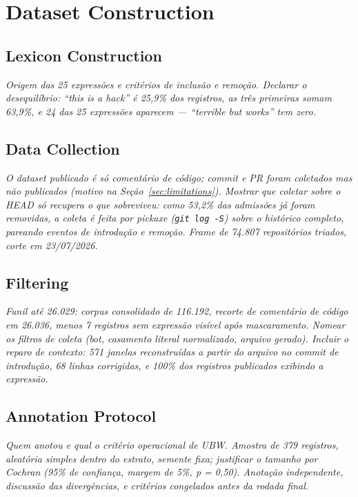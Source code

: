 \documentclass[10pt,conference]{IEEEtran}
\begin{document}
\section{Dataset Construction}
\label{sec:construction}

\subsection{Lexicon Construction}

\textit{Origem das 25 expressões e critérios de inclusão e remoção. Declarar o
desequilíbrio: ``this is a hack'' é 25,9\% dos registros, as três primeiras
somam 63,9\%, e 24 das 25 expressões aparecem — ``terrible but works'' tem zero.}

\subsection{Data Collection}

\textit{O dataset publicado é só comentário de código; commit e PR foram
coletados mas não publicados (motivo na Seção~\ref{sec:limitations}). Mostrar
que coletar sobre o HEAD só recupera o que sobreviveu: como 53,2\% das
admissões já foram removidas, a coleta é feita por pickaxe (\texttt{git log -S})
sobre o histórico completo, pareando eventos de introdução e remoção. Frame de
74.807 repositórios triados, corte em 23/07/2026.}

\subsection{Filtering}

\textit{Funil até 26.029: corpus consolidado de 116.192, recorte de comentário
de código em 26.036, menos 7 registros sem expressão visível após mascaramento.
Nomear os filtros de coleta (bot, casamento literal normalizado, arquivo
gerado). Incluir o reparo de contexto: 571 janelas reconstruídas a partir do
arquivo no commit de introdução, 68 linhas corrigidas, e 100\% dos registros
publicados exibindo a expressão.}

\subsection{Annotation Protocol}

\textit{Quem anotou e qual o critério operacional de UBW. Amostra de 379
registros, aleatória simples dentro do estrato, semente fixa; justificar o
tamanho por Cochran (95\% de confiança, margem de 5\%, p = 0,50). Anotação
independente, discussão das divergências, e critérios congelados antes da
rodada final.}
\end{document}
